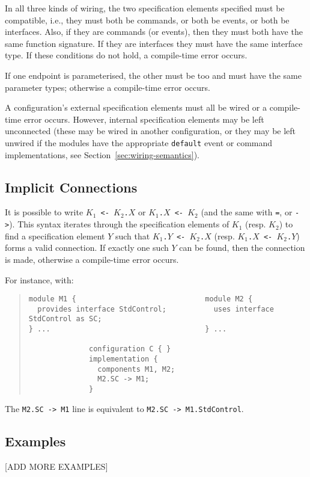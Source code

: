 \documentclass[11pt,letterpaper]{article}
\newcommand{\kw}[1]{{\tt #1}}
\newcommand{\code}[1]{{\tt #1}}
\begin{document}
In all three kinds of wiring, the two specification elements specified must
be compatible, i.e., they must both be commands, or both be events, or both
be interfaces. Also, if they are commands (or events), then they
must both have the same function signature. If they are interfaces
they must have the same interface type. If these conditions do not hold,
a compile-time error occurs.

If one endpoint is parameterised, the other must be too and must have the
same parameter types; otherwise a compile-time error occurs.

A configuration's external specification elements must all be wired or
a compile-time error occurs. However, internal specification elements
may be left unconnected (these may be wired in another configuration,
or they may be left unwired if the modules have the appropriate
\kw{default} event or command implementations, see
Section~\ref{sec:wiring-semantics}).

\subsection{Implicit Connections}
\label{sec:implicit}

It is possible to write \code{$K_1$ <- $K_2$.$X$} or \code{$K_1$.$X$ <-
$K_2$} (and the same with \kw{=}, or \kw{->}). This syntax iterates through
the specification elements of $K_1$ (resp. $K_2$) to find a specification
element $Y$ such that \code{$K_1$.$Y$ <- $K_2$.$X$} (resp. \code{$K_1$.$X$
<- $K_2$.$Y$}) forms a valid connection. If exactly one such $Y$ can
be found, then the connection is made, otherwise a compile-time error
occurs.

For instance, with:
\begin{quote} \begin{verbatim}
module M1 {                              module M2 {
  provides interface StdControl;           uses interface StdControl as SC;
} ...                                    } ...

              configuration C { }
              implementation {
                components M1, M2;
                M2.SC -> M1;
              }
\end{verbatim} \end{quote}
The \code{M2.SC -> M1} line is equivalent to \code{M2.SC -> M1.StdControl}.

\subsection{Examples}
[ADD MORE EXAMPLES]
\end{document}

